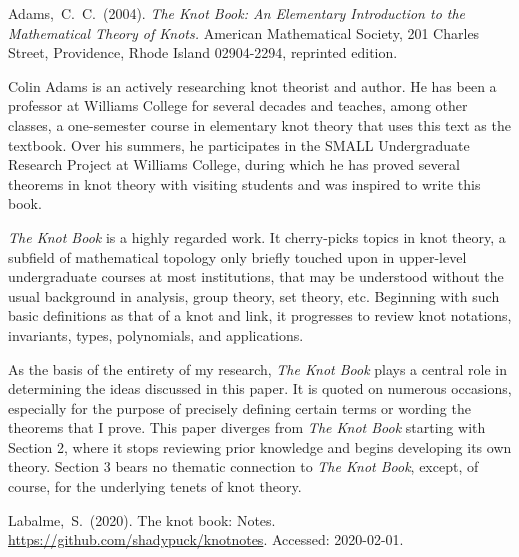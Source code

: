 \documentclass[titlepage,11pt]{article}
\newenvironment{bibcomment}{
    \item[]
    \begingroup
    \par
    \parshape0
}{
    \par
    \endgroup
}
\begin{document}
\begin{thebibliography}{1}
    Adams,~C.~C.~(2004).
    \newblock \emph{The Knot Book: An Elementary Introduction to the Mathematical Theory of Knots.}
    \newblock American Mathematical Society, 201 Charles Street, Providence, Rhode Island 02904-2294, reprinted edition.

    \begin{bibcomment}
        \setlength{\leftskip}{1cm}
        Colin Adams is an actively researching knot theorist and author. He has been a professor at Williams College for several decades and teaches, among other classes, a one-semester course in elementary knot theory that uses this text as the textbook. Over his summers, he participates in the SMALL Undergraduate Research Project at Williams College, during which he has proved several theorems in knot theory with visiting students and was inspired to write this book.\par
        \hspace{1em}\emph{The Knot Book} is a highly regarded work. It cherry-picks topics in knot theory, a subfield of mathematical topology only briefly touched upon in upper-level undergraduate courses at most institutions, that may be understood without the usual background in analysis, group theory, set theory, etc. Beginning with such basic definitions as that of a knot and link, it progresses to review knot notations, invariants, types, polynomials, and applications.\par
        \hspace{1em}As the basis of the entirety of my research, \emph{The Knot Book} plays a central role in determining the ideas discussed in this paper. It is quoted on numerous occasions, especially for the purpose of precisely defining certain terms or wording the theorems that I prove. This paper diverges from \emph{The Knot Book} starting with Section 2, where it stops reviewing prior knowledge and begins developing its own theory. Section 3 bears no thematic connection to \emph{The Knot Book}, except, of course, for the underlying tenets of knot theory.\par
    \end{bibcomment}

    Labalme,~S.~(2020).
    \newblock The knot book: Notes.
    \newblock \url{https://github.com/shadypuck/knotnotes}. Accessed: 2020-02-01.


\end{thebibliography}
\end{document}
